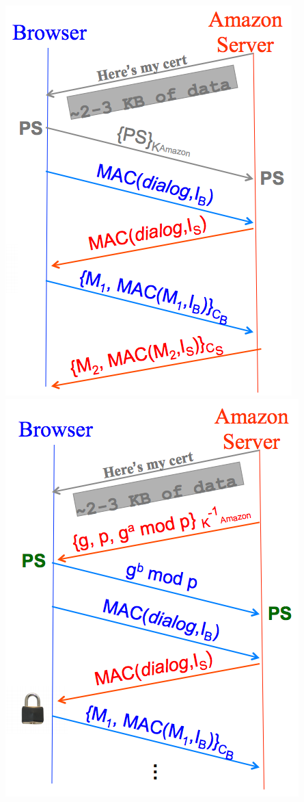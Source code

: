 \documentclass[10pt,landscape]{article}
\begin{document}
\begin{multicols}{3}
\begin{multicols}{2}
\includegraphics[scale=0.26]{keyexch_rsa.png}
\columnbreak
\includegraphics[scale=0.26]{keyexch_dh.png}
\end{multicols}


\end{multicols}
\end{document}
